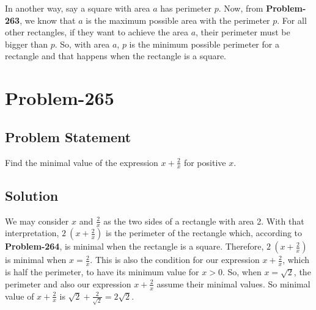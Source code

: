 \documentclass[12pt]{article}
\begin{document}
In another way, say a square with area $a$ has perimeter $p$. Now, from \textbf{Problem-263}, we know that $a$ is the maximum possible area with the perimeter $p$. For all other rectangles, if they want to achieve the area $a$, their perimeter must be bigger than $p$. So, with area $a$, $p$ is the minimum possible perimeter for a rectangle and that happens when the rectangle is a square.

\section*{Problem-265}
\subsection*{Problem Statement}
Find the minimal value of the expression $x + \frac{2}{x}$ for positive $x$.

\subsection*{Solution}
We may consider $x$ and $\frac{2}{x}$ as the two sides of a rectangle with area 2. With that interpretation, $2\ \left( x + \frac{2}{x} \right)$ is the perimeter of the rectangle which, according to \textbf{Problem-264}, is minimal when the rectangle is a square. Therefore, $2\ \left( x + \frac{2}{x} \right)$ is minimal when $x = \frac{2}{x}$. This is also the condition for our expression $x + \frac{2}{x}$, which is half the perimeter, to have its minimum value for $x > 0$. So, when $x = \sqrt{2}$, the perimeter and also our expression $x + \frac{2}{x}$ assume their minimal values. So minimal value of $x + \frac{2}{x}$ is $\sqrt{2} + \frac{2}{\sqrt{2}} = 2\sqrt{2}$.
\end{document}

